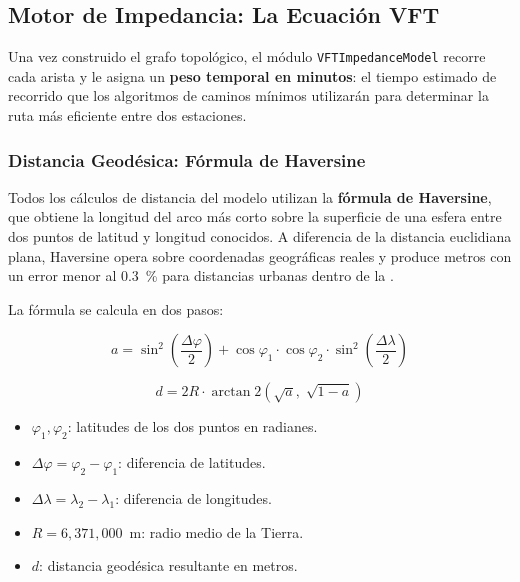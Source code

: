 
\subsection{Motor de Impedancia: La Ecuación VFT}
\label{sec:vft-impedancia}

Una vez construido el grafo topológico, el módulo \texttt{VFTImpedanceModel}
recorre cada arista y le asigna un \textbf{peso temporal en minutos}: el tiempo
estimado de recorrido que los algoritmos de caminos mínimos utilizarán para
determinar la ruta más eficiente entre dos estaciones.

\subsubsection{Distancia Geodésica: Fórmula de Haversine}
\label{subsec:vft-haversine}

Todos los cálculos de distancia del modelo utilizan la
\textbf{fórmula de Haversine}, que obtiene la longitud del arco más corto sobre
la superficie de una esfera entre dos puntos de latitud y longitud conocidos. A
diferencia de la distancia euclidiana plana, Haversine opera sobre coordenadas
geográficas reales y produce metros con un error menor al 0.3~\% para distancias
urbanas dentro de la \zmvm{}.

La fórmula se calcula en dos pasos:

\begin{equation}
    a = \sin^{2}\!\left(\frac{\Delta\varphi}{2}\right)
        + \cos\varphi_1 \cdot \cos\varphi_2
          \cdot \sin^{2}\!\left(\frac{\Delta\lambda}{2}\right)
    \label{eq:haversine-a}
\end{equation}

\begin{equation}
    d = 2R \cdot \arctan2\!\left(\sqrt{a},\;\sqrt{1-a}\right)
    \label{eq:haversine-d}
\end{equation}

\begin{itemize}
    \item $\varphi_1, \varphi_2$: latitudes de los dos puntos en radianes.
    \item $\Delta\varphi = \varphi_2 - \varphi_1$: diferencia de latitudes.
    \item $\Delta\lambda = \lambda_2 - \lambda_1$: diferencia de longitudes.
    \item $R = 6{,}371{,}000$~m: radio medio de la Tierra.
    \item $d$: distancia geodésica resultante en metros.
\end{itemize}

